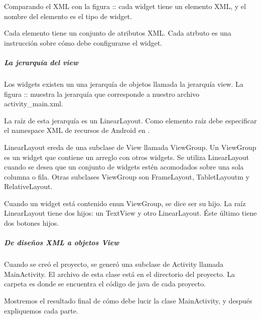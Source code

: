 Comparando el XML con la figura :: cada widget tiene un elemento XML, y el
nombre del elemento es el tipo de widget.

Cada elemento tiene un conjunto de atributos XML. Cada atrbuto es una instrucción
sobre cómo debe configurarse el widget.


\subparagraph{La jerarquía del view}
\label{\detokenize{dev_docs:la-jerarquia-del-view}}
Los widgets existen un una jerarquía de objetos  llamada la jerarquía
view. La figura :: muestra la jerarquía que corresponde a nuestro archivo
activity\_main.xml.

La raíz de esta jerarquía es un LinearLayout. Como elemento raíz debe especificar
el namespace XML de recursos de Android en .

LinearLayout ereda de una subclase de View llamada ViewGroup. Un ViewGroup es un
widget que contiene un arreglo con otros widgets. Se utiliza LinearLayout cuando
se desea que un conjunto de widgets estén acomodados sobre una sola columna
o fila. Otras subclases ViewGroup son FrameLayout, TabletLayoutm y RelativeLayout.

Cuando un widget está contenido enun ViewGroup, se dice ser su hijo. La raíz
LinearLayout tiene dos hijos: un TextView y otro LinearLayout. Éste último
tiene dos botones hijos.


\subparagraph{De diseños XML a objetos View}
\label{\detokenize{dev_docs:de-disenos-xml-a-objetos-view}}
Cuando se creó el proyecto, se generó una subclase de Activity llamada
MainActivity. El archivo de esta clase está en el directorio  del
proyecto. La carpeta  es donde se encuentra el código de java de cada
proyecto.

Mostremos el resultado final de cómo debe lucir la clase MainActivity,
y después expliquemos cada parte.

